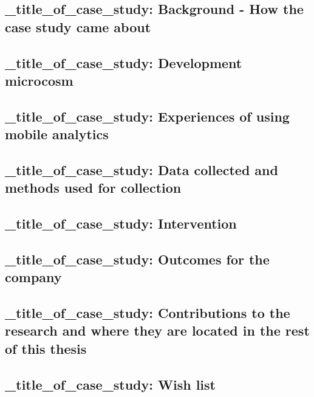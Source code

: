 \subsection{_title_of_case_study: Background - How the case study came about}

\subsection{_title_of_case_study: Development microcosm}

\subsection{_title_of_case_study: Experiences of using mobile analytics}

\subsection{_title_of_case_study: Data collected and methods used for collection}

\subsection{_title_of_case_study: Intervention}

\subsection{_title_of_case_study: Outcomes for the company}

\subsection{_title_of_case_study: Contributions to the research and where they are located in the rest of this thesis}

\subsection*{_title_of_case_study: Wish list}

\clearpage

